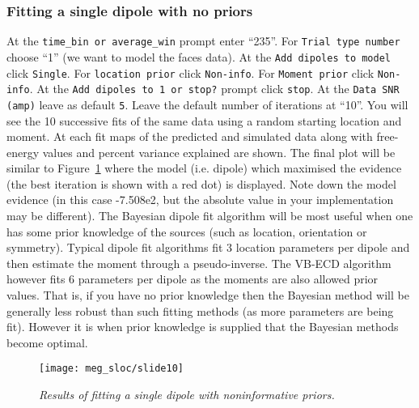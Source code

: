 \subsubsection{Fitting a single dipole with no priors}
At the \texttt{time\_bin or average\_win} prompt enter ``235''. For \texttt{Trial type number} choose ``1'' (we want to model the faces data). At the \texttt{Add dipoles to model} click \texttt{Single}. For \texttt{location prior} click \texttt{Non-info}. For \texttt{Moment prior} click \texttt{Non-info}. At the \texttt{Add dipoles to 1 or stop?} prompt click \texttt{stop}. At the \texttt{Data SNR (amp)} leave as default \texttt{5}. Leave the default number of iterations at ``10''.
You will see the 10 successive fits of the same data using a random starting location and moment. At each fit maps of the predicted and simulated data along with free-energy values and percent variance explained are shown. The final plot will be similar to Figure~\ref{meg_sloc:fig:10} where the model (i.e. dipole) which maximised the evidence (the best iteration is shown with a red dot) is displayed. Note down the model evidence (in this case -7.508e2, but the absolute value in your implementation may be different). The Bayesian dipole fit algorithm will be most useful when one has some prior knowledge of the sources (such as location, orientation or symmetry). Typical dipole fit algorithms fit 3 location parameters per dipole and then estimate the moment through a pseudo-inverse. The VB-ECD algorithm however fits 6 parameters per dipole as the moments are also allowed prior values. That is, if you have no prior knowledge then the Bayesian method will be generally less robust than such fitting methods (as more parameters are being fit). However it is when prior knowledge is supplied that the Bayesian methods become optimal.

\begin{figure}
\begin{center}
\texttt{[image: meg\_sloc/slide10]}
\caption{\em Results of fitting a single dipole with noninformative priors.\label{meg_sloc:fig:10}}
\end{center}
\end{figure}


